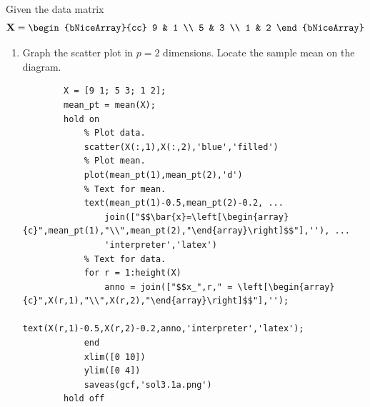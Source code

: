 Given the data matrix
\[
    \textbf{X}
    =
    \begin{bNiceArray}{cc}
        9 & 1 \\
        5 & 3 \\
        1 & 2
    \end{bNiceArray}
\]
\begin{enumerate}[label=(\alph*)]
    \item Graph the scatter plot in $p=2$ dimensions. Locate the sample mean on the diagram.
    \begin{lstlisting}
        X = [9 1; 5 3; 1 2];
        mean_pt = mean(X);
        hold on
            % Plot data.
            scatter(X(:,1),X(:,2),'blue','filled')
            % Plot mean.
            plot(mean_pt(1),mean_pt(2),'d')
            % Text for mean.
            text(mean_pt(1)-0.5,mean_pt(2)-0.2, ...
                join(["$$\bar{x}=\left[\begin{array}{c}",mean_pt(1),"\\",mean_pt(2),"\end{array}\right]$$"],''), ...
                'interpreter','latex')
            % Text for data.
            for r = 1:height(X)
                anno = join(["$$x_",r," = \left[\begin{array}{c}",X(r,1),"\\",X(r,2),"\end{array}\right]$$"],'');
                text(X(r,1)-0.5,X(r,2)-0.2,anno,'interpreter','latex');
            end
            xlim([0 10])
            ylim([0 4])
            saveas(gcf,'sol3.1a.png')
        hold off
    \end{lstlisting}


\end{enumerate}
